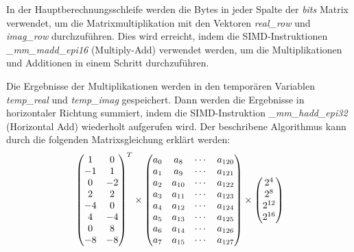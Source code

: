 \documentclass[course=erap]{aspdoc}
\begin{document}
    In der Hauptberechnungsschleife werden die Bytes in jeder Spalte der \textit{bits} Matrix verwendet, um die Matrixmultiplikation mit den Vektoren \textit{real\_row} und \textit{imag\_row} durchzuführen. Dies wird erreicht, indem die SIMD-Instruktionen \textit{\_mm\_madd\_epi16} (Multiply-Add) verwendet werden, um die Multiplikationen und Additionen in einem Schritt durchzuführen.

    Die Ergebnisse der Multiplikationen werden in den temporären Variablen \textit{temp\_real} und \textit{temp\_imag} gespeichert. Dann werden die Ergebnisse in horizontaler Richtung summiert, indem die SIMD-Instruktion \textit{\_mm\_hadd\_epi32} (Horizontal Add) wiederholt aufgerufen wird.
    \newpage
    Der beschribene Algorithmus kann durch die folgenden Matrixsgleichung erklärt werden:
    \[
        \newline
        \begin{pmatrix}
            1  & 0  \\
            -1 & 1  \\
            0  & -2 \\
            2  & 2  \\
            -4 & 0  \\
            4  & -4 \\
            0  & 8  \\
            -8 & -8
        \end{pmatrix}
        ^{T}
        \times
        \begin{pmatrix}
            a_0 & a_8    & \cdots & a_{120} \\
            a_1 & a_9    & \cdots & a_{121} \\
            a_2 & a_{10} & \cdots & a_{122} \\
            a_3 & a_{11} & \cdots & a_{123} \\
            a_4 & a_{12} & \cdots & a_{124} \\
            a_5 & a_{13} & \cdots & a_{125} \\
            a_6 & a_{14} & \cdots & a_{126} \\
            a_7 & a_{15} & \cdots & a_{127}
        \end{pmatrix}
        \times
        \begin{pmatrix}
            2^4    \\
            2^8    \\
            2^{12} \\
            2^{16} \\

\end{pmatrix}\]
\end{document}
